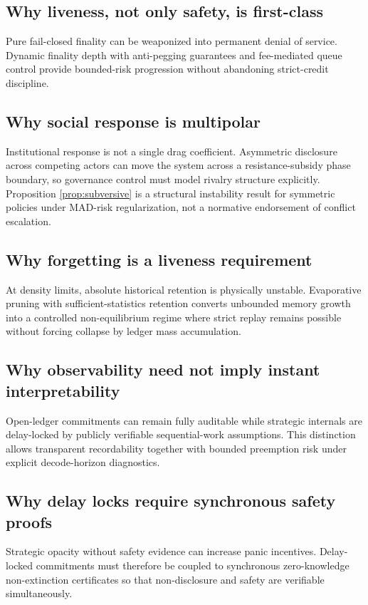 \documentclass[11pt,a4paper]{article}
\theoremstyle{definition}
\theoremstyle{remark}
\begin{document}
\subsection{Why liveness, not only safety, is first-class}
Pure fail-closed finality can be weaponized into permanent denial of service.
Dynamic finality depth with anti-pegging guarantees and fee-mediated queue control provide bounded-risk progression without abandoning strict-credit discipline.

\subsection{Why social response is multipolar}
Institutional response is not a single drag coefficient.
Asymmetric disclosure across competing actors can move the system across a resistance-subsidy phase boundary, so governance control must model rivalry structure explicitly.
Proposition \ref{prop:subversive} is a structural instability result for symmetric policies under MAD-risk regularization, not a normative endorsement of conflict escalation.

\subsection{Why forgetting is a liveness requirement}
At density limits, absolute historical retention is physically unstable.
Evaporative pruning with sufficient-statistics retention converts unbounded memory growth into a controlled non-equilibrium regime where strict replay remains possible without forcing collapse by ledger mass accumulation.

\subsection{Why observability need not imply instant interpretability}
Open-ledger commitments can remain fully auditable while strategic internals are delay-locked by publicly verifiable sequential-work assumptions.
This distinction allows transparent recordability together with bounded preemption risk under explicit decode-horizon diagnostics.

\subsection{Why delay locks require synchronous safety proofs}
Strategic opacity without safety evidence can increase panic incentives.
Delay-locked commitments must therefore be coupled to synchronous zero-knowledge non-extinction certificates so that non-disclosure and safety are verifiable simultaneously.
\end{document}
